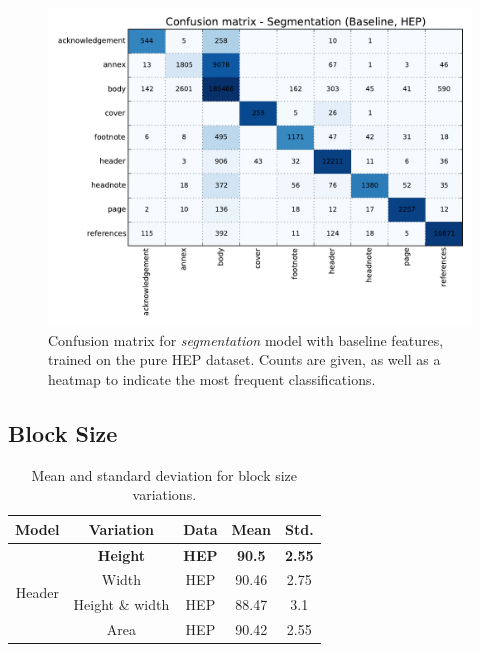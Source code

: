 \begin{figure}[h]
\center
\includegraphics[width=5.5in]{Figures/baseline_confusion_segmentation.pdf}
\caption{Confusion matrix for \emph{segmentation} model with baseline features, trained on the pure HEP dataset. Counts are given, as well as a heatmap to indicate the most frequent classifications.}
\label{fig:segmentation_baseline_confusion}
\end{figure}

\subsection{Block Size}

\begin{table}[h]
\begin{center}
\begin{tabular}{|c|c|c|c|c|}
\hline
Model & Variation & Data & Mean & Std.\\
\hline
\multirow{4}{*}{Header} & \textbf{Height} & \textbf{HEP} & \textbf{90.5} & \textbf{2.55}\\\cline{2-5}
& Width & HEP & 90.46 & 2.75\\\cline{2-5}
& Height \& width & HEP  & 88.47 & 3.1\\\cline{2-5}
& Area & HEP  & 90.42 & 2.55\\\cline{2-5}
\hline
\end{tabular}
\caption{Mean and standard deviation for block size variations.}
\label{table:blockshaperesults}
\end{center}
\end{table}

